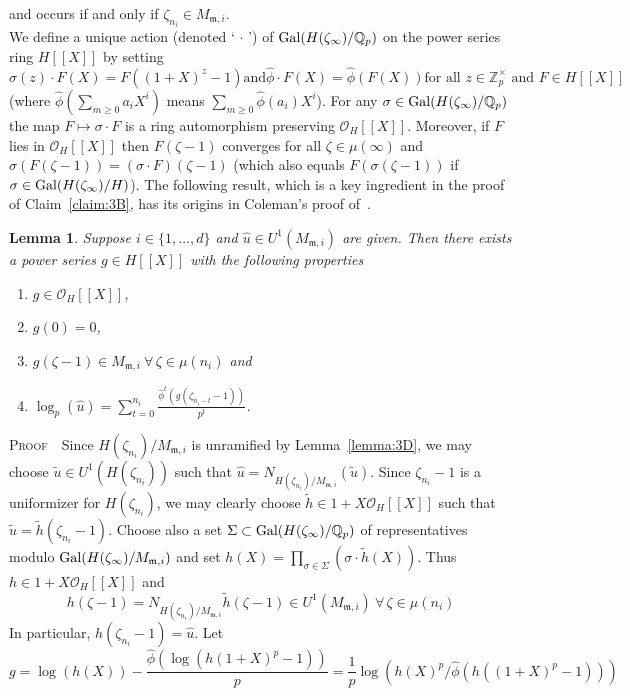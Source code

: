 \documentclass[12pt]{article}
\newtheorem{lemma}{Lemma}[section]
\newcounter{rem}[section]%
\newcommand{\bbQ}{\ensuremath{\mathbb{Q}}}
\newcommand{\bbZ}{\ensuremath{\mathbb{Z}}}
\newcommand{\beql}[1]{\begin{equation}\label{#1}}
\newcommand{\bPf}{\noindent \textsc{Proof\ }}
\newcommand{\cO}{\ensuremath{\mathcal{O}}}
\newcommand{\eeq}{\end{equation}}
\newcommand{\fm}{\ensuremath{\mathfrak{m}}}
\newcommand{\Gal}{{\rm Gal}}
\newcommand{\rem}{\refstepcounter{rem}\noindent{\sc Remark \therem}}%
\renewcommand{\therem}{\thesection.\arabic{rem}}
\newcommand{\Mmi}{\ensuremath{M_{\fm,i}}}
\begin{document}
and occurs if and only if $\zeta_{n_i}\in M_{\fm,i}$.\vspace{1ex}\\
We define a unique action (denoted `$\,\cdot\,$')
of $\Gal(H(\zeta_\infty)/\bbQ_p)$ on the power series
ring $H[[X]]$ by setting
\[
\mbox{
$\hat{\sigma}(z)\cdot F(X)=F((1+X)^z-1)$
and
$\hat{\phi}\cdot F(X)=\hat{\phi}(F(X))$
for all $z\in\bbZ_p^\times$ and $F\in H[[X]]$}
\]
(where $\hat{\phi}(\sum_{m\geq 0}a_iX^i)$ means $\sum_{m\geq 0}\hat{\phi}(a_i)X^i$).
For any $\sigma\in \Gal(H(\zeta_\infty)/\bbQ_p)$ the
map $F\mapsto \sigma\cdot F$ is a ring automorphism
preserving $\cO_H[[X]]$.
Moreover, if $F$ lies in $\cO_H[[X]]$ then $F(\zeta-1)$ converges
for all $\zeta\in \mu(\infty)$ and $\sigma(F(\zeta-1))=(\sigma\cdot F)(\zeta-1)$
(which also equals $F(\sigma(\zeta-1))$ if $\sigma\in \Gal(H(\zeta_\infty)/H)$).
The following result, which is a key ingredient in the proof of Claim~\ref{claim:3B}, has
its origins in Coleman's proof of~\cite[Thm.~26]{Coleman1}.
\begin{lemma}\label{lemma:3E} Suppose $i\in\{1,\ldots,d\}$ and $\hat{u}\in U^1(\Mmi)$ are given.
Then there exists a power series $g\in H[[X]]$ with the following properties
\begin{enumerate}
\item\label{A} $g\in\cO_H[[X]]$,
\item\label{B} $g(0)=0$,
\item\label{D} $g(\zeta-1)\in\Mmi\ \forall\,\zeta\in\mu(n_i)$ and
\item\label{C} ${\displaystyle\log_p(\hat{u})=\sum_{t=0}^{n_i}
\frac{\hat{\phi}^t(g(\zeta_{n_i-t}-1))}{p^t}}$.
\end{enumerate}
\end{lemma}
\bPf\ Since $H(\zeta_{n_i})/M_{\fm,i}$ is unramified
by Lemma~\ref{lemma:3D}, we may choose
$\tilde{u}\in U^1(H(\zeta_{n_i}))$ such that
$\hat{u}=N_{H(\zeta_{n_i})/M_{\fm,i}}(\tilde{u})$. Since $\zeta_{n_i}-1$ is a uniformizer
for $H(\zeta_{n_i})$, we may clearly choose $\tilde{h}\in 1+X\cO_H[[X]]$
such that $\tilde{u}=\tilde{h}(\zeta_{n_i}-1)$. Choose also a
set $\Sigma\subset \Gal(H(\zeta_\infty)/\bbQ_p)$ of representatives modulo
$\Gal(H(\zeta_\infty)/\Mmi)$ and set
$h(X)=\prod_{\sigma\in\Sigma}(\sigma\cdot\tilde{h}(X))$. Thus $h\in 1+X\cO_H[[X]]$ and
\beql{eq:3J}
h(\zeta-1)=N_{H(\zeta_{n_i})/M_{\fm,i}}\tilde{h}(\zeta-1)
\in U^1(\Mmi)\ \forall\,\zeta\in\mu(n_i)
\eeq
In particular, $h(\zeta_{n_i}-1)=\hat{u}$. Let
\[
g=\log(h(X))-\frac{\hat{\phi}(\log(h(1+X)^p-1))}{p}=\frac{1}{p}
\log(h(X)^p/\hat{\phi}(h((1+X)^p-1)))
\]
\end{document}
